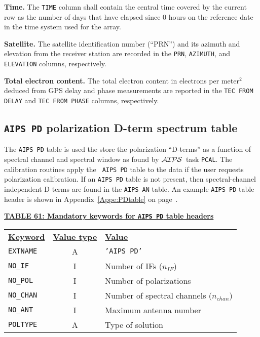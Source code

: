 \documentclass[twoside]{article}
\newcommand{\AIPS}{{$\cal AIPS\/$}}
\newcommand{\nif}{$n_{IF}$}
\newcommand{\nchan}{$n_{chan}$}
\begin{document}
{\bf Time.}  The {\tt TIME} column shall contain the central time
covered by the current row as the number of days that have elapsed
since 0 hours on the reference date in the time system used for the
array.

{\bf Satellite.} The satellite identification number (``PRN'') and its
azimuth and elevation from the receiver station are recorded in the
{\tt PRN}, {\tt AZIMUTH}, and {\tt ELEVATION} columns, respectively.

{\bf Total electron content.} The total electron content in electrons
per meter$^2$ deduced from GPS delay and phase measurements are
reported in the {\tt TEC FROM DELAY} and {\tt TEC FROM PHASE} columns,
respectively.

\subsection{{\tt AIPS PD} polarization D-term spectrum table}
\label{s:PD}

The {\tt AIPS PD} table is used the store the polarization ``D-terms''
as a function of spectral channel and spectral window as found by
\AIPS\ task {\tt PCAL}\@.  The calibration routines apply the {\tt
  AIPS PD} table to the data if the user requests polarization
calibration.  If an {\tt AIPS PD} table is not present, then
spectral-channel independent D-terms are found in the {\tt AIPS AN}
table.  An example {\tt AIPS PD} table header is shown in
Appendix~\ref{Appe:PDtable} on page~\pageref{Appe:PDtable}.

\begin{center}
\underline{\bf{TABLE 61: Mandatory keywords for {\tt AIPS PD} table
    headers}}\\
\begin{tabular}{lcl}
\noalign{\vspace{2pt}} \label{ta:PDkeys}
\underline{{\bf Keyword}} & \underline{\bf{Value type}} &
    \underline{\bf{Value\vphantom{y}}} \\
\noalign{\vspace{2pt}}
{\tt EXTNAME}   & A & {\tt 'AIPS PD'}  \\
{\tt NO\_IF}    & I & Number of IFs (\nif)\\
{\tt NO\_POL}   & I & Number of polarizations \\
{\tt NO\_CHAN}  & I & Number of spectral channels (\nchan) \\
{\tt NO\_ANT}   & I & Maximum antenna number \\
{\tt POLTYPE}   & A & Type of solution
\end{tabular}
\end{center}
\end{document}
